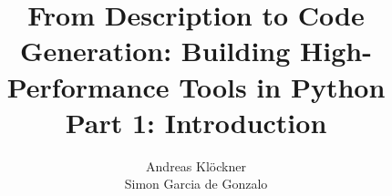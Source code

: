 \documentclass[english,compress]{beamer}
\begin{document}

\title{
  From Description to Code Generation: Building High-Performance Tools in Python\\
  Part 1: Introduction
}

\author{
  Andreas Klöckner\\
  Simon Garcia de Gonzalo
}


\date{}

\frame{
  \titlepage
}
\end{document}
